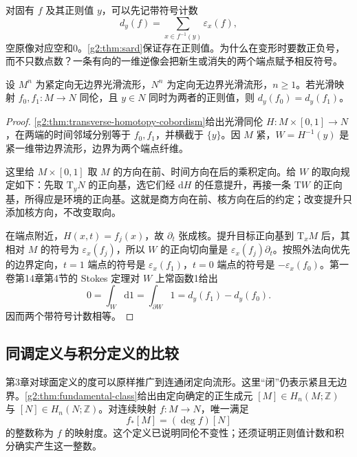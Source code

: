 对固有 \(f\) 及其正则值 \(y\)，可以先记带符号计数
\[
	d_y(f)=\sum_{x\in f^{-1}(y)}\varepsilon_x(f),
\]
空原像对应空和0。\cref{g2:thm:sard}保证存在正则值。为什么在变形时要数正负号，而不只数点数？一条有向的一维逆像会把新生或消失的两个端点赋予相反符号。

\begin{proposition}\label{g2:prop:oriented-regular-fiber-cobordism}
	设 \(M^n\) 为紧定向无边界光滑流形，\(N^n\) 为定向无边界光滑流形，\(n\ge1\)。若光滑映射 \(f_0,f_1:M\to N\) 同伦，且 \(y\in N\) 同时为两者的正则值，则 \(d_y(f_0)=d_y(f_1)\)。
\end{proposition}
\begin{proof}
	\cref{g2:thm:transverse-homotopy-cobordism}给出光滑同伦 \(H:M\times[0,1]\to N\)，在两端的时间邻域分别等于 \(f_0,f_1\)，并横截于 \(\{y\}\)。因 \(M\) 紧，\(W=H^{-1}(y)\) 是紧一维带边界流形，边界为两个端点纤维。

	这里给 \(M\times[0,1]\) 取 \(M\) 的方向在前、时间方向在后的乘积定向。给 \(W\) 的取向规定如下：先取 \(\mathrm{T}_yN\) 的正向基，选它们经 \(\mathrm{d}H\) 的任意提升，再接一条 \(\mathrm{T}W\) 的正向基，所得应是环境的正向基。这就是商方向在前、核方向在后的约定；改变提升只添加核方向，不改变取向。

	在端点附近，\(H(x,t)=f_j(x)\)，故 \(\partial_t\) 张成核。提升目标正向基到 \(\mathrm{T}_xM\) 后，其相对 \(M\) 的符号为 \(\varepsilon_x(f_j)\)，所以 \(W\) 的正向切向量是 \(\varepsilon_x(f_j)\partial_t\)。按照外法向优先的边界定向，\(t=1\) 端点的符号是 \(\varepsilon_x(f_1)\)，\(t=0\) 端点的符号是 \(-\varepsilon_x(f_0)\)。第一卷第14章第4节的 Stokes 定理对 \(W\) 上常函数1给出
	\[
		0=\int_W\mathrm{d}1=\int_{\partial W}1
		=d_y(f_1)-d_y(f_0).
	\]
	因而两个带符号计数相等。
\end{proof}

\subsection{同调定义与积分定义的比较}
\label{g2:subsec:1601:02}

第3章对球面定义的度可以原样推广到连通闭定向流形。这里“闭”仍表示紧且无边界。\cref{g2:thm:fundamental-class}给出由定向确定的正生成元 \([M]\in H_n(M;\mathbb Z)\) 与 \([N]\in H_n(N;\mathbb Z)\)。对连续映射 \(f:M\to N\)，唯一满足
\begin{equation}\label{g2:eq:manifold-homological-degree}
	f_*[M]=(\deg f)[N]
\end{equation}
的整数称为 \(f\) 的映射度。这个定义已说明同伦不变性；还须证明正则值计数和积分确实产生这一整数。


